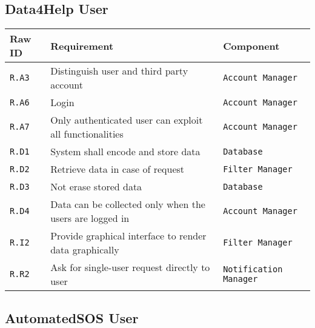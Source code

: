 \documentclass[../DD0.tex]{subfiles}
\begin{document}
\subsection{Data4Help User}

    \begin{table}[h!]

      \centering
      \begin{tabularx}{.8\linewidth}{|X|X|X|}
        \hline
        \textbf{Raw ID} & \textbf{Requirement} & \textbf{Component} \\ \hline
        \texttt{R.A3} & Distinguish user and third party account & \texttt{Account Manager} \\
        \hline
        \texttt{R.A6} & Login & \texttt{Account Manager} \\
        \hline
       \texttt{R.A7} & Only authenticated user can exploit all functionalities & \texttt{Account Manager} \\
        \hline
        \texttt{R.D1} & System shall encode and store data  & \texttt{Database} \\
        \hline
        \texttt{R.D2} & Retrieve data in case of request  & \texttt{Filter Manager} \\
        \hline
        \texttt{R.D3} & Not erase stored data  & \texttt{Database} \\
        \hline
        \texttt{R.D4} & Data can be collected only when the users are logged in &\texttt{Account Manager} \\
        \hline
        \texttt{R.I2} & Provide graphical interface to render data graphically & \texttt{Filter Manager} \\
        \hline
        \texttt{R.R2} & Ask for single-user request directly to user & \texttt{Notification Manager} \\
        \hline
      \end{tabularx}
      \label{tab:datauser}

    \end{table}

\subsection{AutomatedSOS User}
\end{document}
